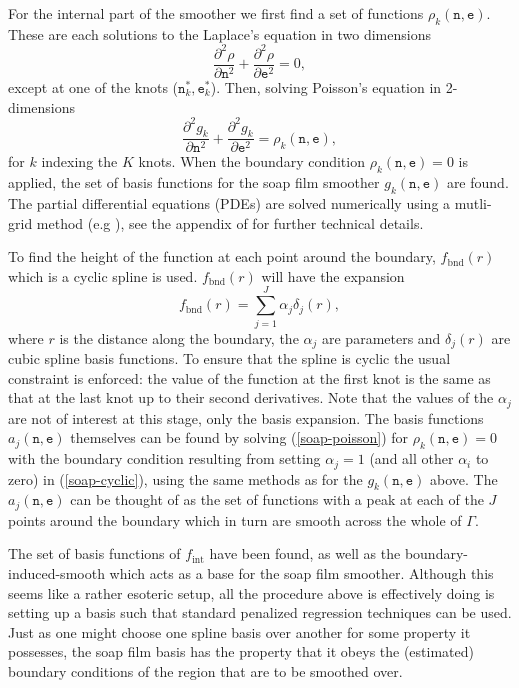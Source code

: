 For the internal part of the smoother we first find a set of functions $\rho_k(\texttt{n},\texttt{e})$. These are each solutions to the Laplace's equation in two dimensions
$$
\frac{\partial^2\rho}{\partial \texttt{n}^2} + \frac{\partial^2\rho}{\partial \texttt{e}^2} = 0,
$$
except at one of the knots ($\texttt{n}^*_k,\texttt{e}^*_k$). Then, solving Poisson's equation in 2-dimensions
\begin{equation}
\frac{\partial^2 g_k}{\partial \texttt{n}^2} + \frac{\partial^2 g_k}{\partial \texttt{e}^2} = \rho_k(\texttt{n},\texttt{e}),
\label{soap-poisson}
\end{equation}
for $k$ indexing the $K$ knots. When the boundary condition $\rho_k(\texttt{n},\texttt{e})=0$ is applied, the set of basis functions for the soap film smoother $g_k(\texttt{n},\texttt{e})$ are found.  The partial differential equations (PDEs) are solved numerically using a mutli-grid method (e.g \cite[section 19.6]{numrec}), see the appendix of \cite{soap} for further technical details.

To find the height of the function at each point around the boundary, $f_\text{bnd}(r)$ which is a cyclic spline is used. $f_\text{bnd}(r)$ will have the expansion
\begin{equation}
f_\text{bnd}(r)=\sum_{j=1}^J \alpha_j \delta_j(r),
\label{soap-cyclic}
\end{equation}
where $r$ is the distance along the boundary, the $\alpha_j$ are parameters and $\delta_j(r)$ are cubic spline basis functions. To ensure that the spline is cyclic the usual constraint is enforced: the value of the function at the first knot is the same as that at the last knot up to their second derivatives. Note that  the values of the $\alpha_j$ are not of interest at this stage, only the basis expansion. The basis functions $a_j(\texttt{n},\texttt{e})$ themselves can be found by solving (\ref{soap-poisson}) for $\rho_k(\texttt{n},\texttt{e})= 0$ with the boundary condition resulting from setting $\alpha_j=1$ (and all other $\alpha_i$ to zero) in (\ref{soap-cyclic}), using the same methods as for the $g_k(\texttt{n},\texttt{e})$ above. The $a_j(\texttt{n},\texttt{e})$ can be thought of as the set of functions with a peak at each of the $J$ points around the boundary which in turn are smooth across the whole of $\Gamma$.

The set of basis functions of $f_\text{int}$ have been found, as well as the boundary-induced-smooth which acts as a base for the soap film smoother. Although this seems like a rather esoteric setup, all the procedure above is effectively doing is setting up a basis such that standard penalized regression techniques can be used. Just as one might choose one spline basis over another for some property it possesses, the soap film basis has the property that it obeys the (estimated) boundary conditions of the region that are to be smoothed over.

